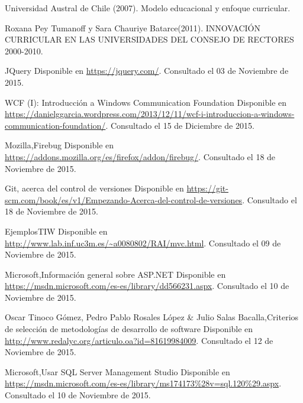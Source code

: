 \begin{spacing}{1.0}
\begin{thebibliography}{99}  

\newblock Universidad Austral de Chile (2007).
\newblock Modelo educacional y enfoque curricular. 

\newblock Roxana Pey Tumanoff y Sara Chauriye Batarce(2011).
\newblock INNOVACIÓN CURRICULAR EN LAS UNIVERSIDADES DEL CONSEJO DE RECTORES 2000-2010. 


\newblock JQuery
\newblock Disponible en \url{https://jquery.com/}.
\newblock Consultado el 03 de Noviembre de 2015.

\newblock WCF (I): Introducción a Windows Communication Foundation
\newblock Disponible en \url{https://danielggarcia.wordpress.com/2013/12/11/wcf-i-introduccion-a-windows-communication-foundation/}.
\newblock Consultado el 15 de Diciembre de 2015.

\newblock Mozilla,Firebug
\newblock Disponible en \url{https://addons.mozilla.org/es/firefox/addon/firebug/}.
\newblock Consultado el 18 de Noviembre de 2015.

\newblock Git,	acerca del control de versiones 
\newblock Disponible en \url{https://git-scm.com/book/es/v1/Empezando-Acerca-del-control-de-versiones}.
\newblock Consultado el 18 de Noviembre de 2015.

\newblock EjemplosTIW
\newblock Disponible en \url{http://www.lab.inf.uc3m.es/~a0080802/RAI/mvc.html}.
\newblock Consultado el 09 de Noviembre de 2015.

\newblock Microsoft,Información general sobre ASP.NET
\newblock Disponible en \url{https://msdn.microsoft.com/es-es/library/dd566231.aspx}.
\newblock Consultado el 10 de Noviembre de 2015.


\newblock  Oscar Tinoco Gómez, Pedro Pablo Rosales López \& Julio Salas Bacalla,Criterios de selección de metodologías de desarrollo de software
\newblock Disponible en \url{http://www.redalyc.org/articulo.oa?id=81619984009}.
\newblock Consultado el 12 de Noviembre de 2015.


\newblock Microsoft,Usar SQL Server Management Studio
\newblock Disponible en \url{https://msdn.microsoft.com/es-es/library/ms174173%28v=sql.120%29.aspx}.
\newblock Consultado el 10 de Noviembre de 2015.


\end{thebibliography}
\end{spacing}
